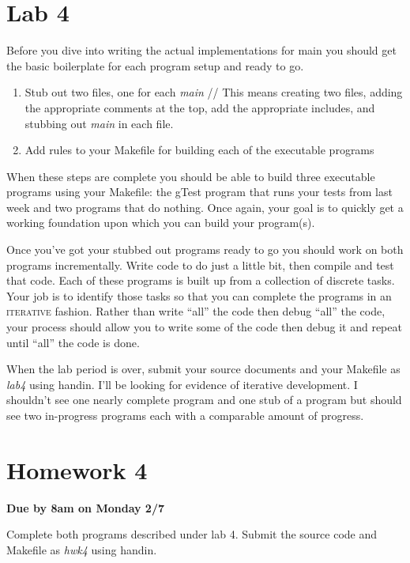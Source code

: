 \documentclass[]{tufte-handout}
\begin{document}
\newpage \thispagestyle{empty}

\section{Lab 4}

Before you dive into writing the actual implementations for main you should get the basic boilerplate for each program setup and ready to go. 
\begin{enumerate}
\item Stub out two files, one for each \textit{main} //
This means creating two files, adding the appropriate comments at the top, add the appropriate includes, and stubbing out \textit{main} in each file. 
\item Add rules to your Makefile for building each of the executable programs
\end{enumerate}
When these steps are complete you should be able to build three executable programs using your Makefile: the gTest program that runs your tests from last week and two programs that do nothing. Once again, your goal is to quickly get a working foundation upon which you can build your program(s). 

Once you've got your stubbed out programs ready to go you should work on both programs incrementally. Write code to do just a little bit, then compile and test that code. Each of these programs is built up from a collection of discrete tasks. Your job is to identify those tasks so that you can complete the programs in an \textsc{iterative} fashion. Rather than write ``all'' the code then debug ``all'' the code, your process should allow you to write some of the code then debug it and repeat until ``all'' the code is done. 

When the lab period is over, submit your source documents and your Makefile as \textit{lab4} using handin. I'll be looking for evidence of iterative development. I shouldn't see one nearly complete program and one stub of a program but should see two in-progress programs each with a comparable amount of progress. 

\newpage \thispagestyle{empty}
\section{Homework 4}

\begin{center}
\textbf{Due by 8am on Monday 2/7}
\end{center}

Complete both programs described under lab 4. Submit the source code and Makefile as \textit{hwk4} using handin. 
\end{document}
